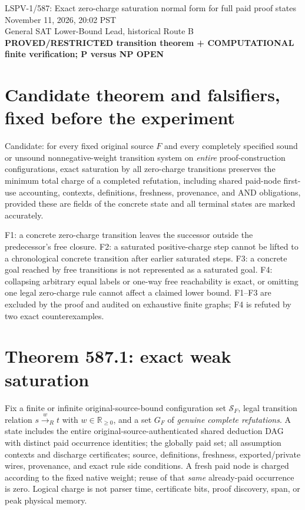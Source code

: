 \documentclass[11pt]{article}
\begin{document}
\begin{center}
{\Large LSPV-1/587: Exact zero-charge saturation normal form for full paid proof states}\\[4pt]
November 11, 2026, 20:02 PST\\
General SAT Lower-Bound Lead, historical Route B\\
\textbf{PROVED/RESTRICTED transition theorem + COMPUTATIONAL finite verification; P versus NP OPEN}
\end{center}
\section*{Candidate theorem and falsifiers, fixed before the experiment}
Candidate: for every fixed original source $F$ and every completely specified sound or unsound nonnegative-weight transition system on \emph{entire} proof-construction configurations, exact saturation by all zero-charge transitions preserves the minimum total charge of a completed refutation, including shared paid-node first-use accounting, contexts, definitions, freshness, provenance, and AND obligations, provided these are fields of the concrete state and all terminal states are marked accurately.

F1: a concrete zero-charge transition leaves the successor outside the predecessor's free closure. F2: a saturated positive-charge step cannot be lifted to a chronological concrete transition after earlier saturated steps. F3: a concrete goal reached by free transitions is not represented as a saturated goal. F4: collapsing arbitrary equal labels or one-way free reachability is exact, or omitting one legal zero-charge rule cannot affect a claimed lower bound. F1--F3 are excluded by the proof and audited on exhaustive finite graphs; F4 is refuted by two exact counterexamples.

\section*{Theorem 587.1: exact weak saturation}
Fix a finite or infinite original-source-bound configuration set $\mathcal S_F$, legal transition relation
$s\xrightarrow{w}_R t$ with $w\in\mathbb R_{\ge0}$, and a set $G_F$ of \emph{genuine complete refutations}. A state includes the entire original-source-authenticated shared deduction DAG with distinct paid occurrence identities; the globally paid set; all assumption contexts and discharge certificates; source, definitions, freshness, exported/private wires, provenance, and exact rule side conditions. A fresh paid node is charged according to the fixed native weight; reuse of that \emph{same} already-paid occurrence is zero. Logical charge is not parser time, certificate bits, proof discovery, span, or peak physical memory.
\end{document}
